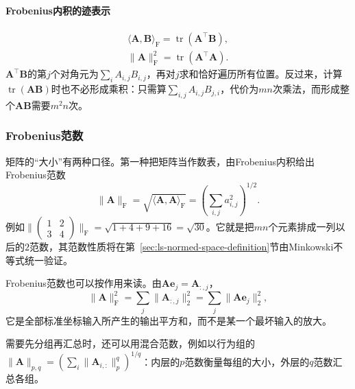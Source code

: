 \paragraph{Frobenius内积的迹表示}
\[
 \begin{gathered}
 \langle\bm A,\bm B\rangle_{\mathrm F}=\operatorname{tr}(\bm A^\top\bm B),\\
 \lVert\bm A\rVert_{\mathrm F}^2=\operatorname{tr}(\bm A^\top\bm A).
 \end{gathered}
\]
$\bm A^\top\bm B$的第$j$个对角元为$\sum_i A_{i,j}B_{i,j}$，再对$j$求和恰好遍历所有位置。反过来，计算$\operatorname{tr}(\bm A\bm B)$时也不必形成乘积：只需算$\sum_{i,j}A_{i,j}B_{j,i}$，代价为$mn$次乘法，而形成整个$\bm A\bm B$需要$m^2n$次。



\subsubsection{Frobenius范数}
\label{sec:ls-frobenius-norm}

矩阵的“大小”有两种口径。第一种把矩阵当作数表，由Frobenius内积给出Frobenius范数
\[
 \lVert\bm A\rVert_{\mathrm F}=\sqrt{\langle\bm A,\bm A\rangle_{\mathrm F}}=\left(\sum_{i,j}a_{i,j}^2\right)^{1/2}.
\]
例如$\lVert\left(\begin{smallmatrix}1&2\\3&4\end{smallmatrix}\right)\rVert_{\mathrm F}=\sqrt{1+4+9+16}=\sqrt{30}$。它就是把$mn$个元素排成一列以后的$2$范数，其范数性质将在第~\ref{sec:ls-normed-space-definition}节由Minkowski不等式统一验证。

Frobenius范数也可以按作用来读。由$\bm A\bm e_j=\bm A_{:,j}$，
\[
 \lVert\bm A\rVert_{\mathrm F}^2=\sum_j\lVert\bm A_{:,j}\rVert_2^2=\sum_j\lVert\bm A\bm e_j\rVert_2^2,
\]
它是全部标准坐标输入所产生的输出平方和，而不是某一个最坏输入的放大。

需要先分组再汇总时，还可以用混合范数，例如以行为组的$\lVert\bm A\rVert_{p,q}=(\sum_i\lVert\bm A_{i,:}\rVert_p^q)^{1/q}$：内层的$p$范数衡量每组的大小，外层的$q$范数汇总各组。
